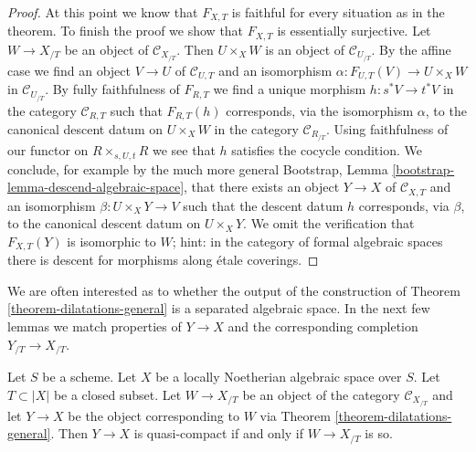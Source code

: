 \begin{proof}
\medskip\noindent
At this point we know that $F_{X, T}$ is faithful for every situation
as in the theorem. To finish the proof we show that $F_{X, T}$ is
essentially surjective. Let $W \to X_{/T}$ be an object of
$\mathcal{C}_{X_{/T}}$. Then $U \times_X W$ is an object of
$\mathcal{C}_{U_{/T}}$. By the affine case we find an object
$V \to U$ of $\mathcal{C}_{U, T}$ and an isomorphism
$\alpha : F_{U, T}(V) \to U \times_X W$ in $\mathcal{C}_{U_{/T}}$.
By fully faithfulness of $F_{R, T}$ we find a unique morphism
$h : s^*V \to t^*V$ in the category $\mathcal{C}_{R, T}$ such that
$F_{R, T}(h)$ corresponds, via the isomorphism $\alpha$, to the
canonical descent datum on $U \times_X W$ in the category
$\mathcal{C}_{R_{/T}}$. Using faithfulness of our functor on
$R \times_{s, U, t} R$ we see that $h$ satisfies the cocycle
condition. We conclude, for example by the much more general
Bootstrap, Lemma \ref{bootstrap-lemma-descend-algebraic-space},
that there exists an object $Y \to X$ of $\mathcal{C}_{X, T}$
and an isomorphism $\beta : U \times_X Y \to V$ such that the
descent datum $h$ corresponds, via $\beta$, to the canonical descent
datum on $U \times_X Y$. We omit the verification that
$F_{X, T}(Y)$ is isomorphic to $W$; hint: in the category of formal
algebraic spaces there is descent for morphisms along \'etale coverings.
\end{proof}

\noindent
We are often interested as to whether the output of the construction
of Theorem \ref{theorem-dilatations-general} is a separated algebraic space.
In the next few lemmas we match properties of $Y \to X$ and the corresponding
completion $Y_{/T} \to X_{/T}$.

\begin{lemma}
\label{lemma-output-quasi-compact}
Let $S$ be a scheme. Let $X$ be a locally Noetherian algebraic space over $S$.
Let $T \subset |X|$ be a closed subset. Let $W \to X_{/T}$ be an object
of the category $\mathcal{C}_{X_{/T}}$ and let $Y \to X$ be the object
corresponding to $W$ via Theorem \ref{theorem-dilatations-general}.
Then $Y \to X$ is quasi-compact if and only if $W \to X_{/T}$ is so.
\end{lemma}

